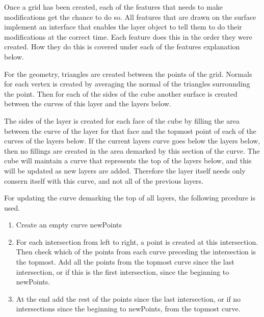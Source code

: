\documentclass[a4paper,12pt]{report}
\begin{document}
Once a grid has been created, each of the features that needs to make modifications get the chance to do so. All features that are drawn on the surface implement an interface that enables the layer object to tell them to do their modifications at the correct time. Each feature does this in the order they were created. How they do this is covered under each of the features explanation below.

For the geometry, triangles are created between the points of the grid. Normals for each vertex is created by averaging the normal of the triangles surrounding the point. Then for each of the sides of the cube another surface is created between the curves of this layer and the layers below.

The sides of the layer is created for each face of the cube by filling the area between the curve of the layer for that face and the topmost point of each of the curves of the layers below. If the current layers curve goes below the layers below, then no fillings are created in the area demarked by this section of the curve. The cube will maintain a curve that represents the top of the layers below, and this will be updated as new layers are added. Therefore the layer itself needs only consern itself with this curve, and not all of the previous layers.

For updating the curve demarking the top of all layers, the following prcedure is used. 
\begin{enumerate}
 \item Create an empty curve newPoints
 \item For each intersection from left to right, a point is created at this intersection. Then check which of the points from each curve preceding the intersection is the topmost. Add all the points from the topmost curve since the last intersection, or if this is the first intersection, since the beginning to newPoints.
 \item At the end add the rest of the points since the last intersection, or if no intersections since the beginning to newPoints, from the topmost curve.
\end{enumerate}
\end{document}
